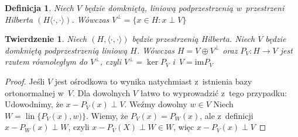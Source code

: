 \documentclass[11pt]{mwrep}
\renewcommand{\[}{\begin{equation}}
\renewcommand{\]}{\end{equation}}
\newcommand{\lin}{\operatorname{lin}}
\newcommand{\scal}{\langle \cdot,\cdot \rangle}
\newcommand{\im}{\mathrm{im}}
\newtheorem{twr}[subsection]{Twierdzenie}%
\newtheorem{de}[subsection]{Definicja}
\begin{document}
\begin{de}
	Niech $V$ będzie domkniętą, liniową  podprzestrzenią w~przestrzeni Hilberta $(H\scal)$.
	Wówczas $V^\perp = \{x \in H : x\perp V\}$ 
\end{de}
\begin{twr}
	Niech $(H,\scal)$ będzie przestrzenią Hilberta. Niech $V$ będzie domkniętą podprzestrzenią liniową $H$.
	Wówczas $H = V\oplus V^\perp$ oraz $P_V \colon H \to V$  jest rzutem równoległym do $V^\perp$, czyli $V^\perp = \ker P_V$ i~$V = \im P_V$
\end{twr}
\begin{proof}
	Jeśli $V$ jest ośrodkowa to wynika natychmiast z~istnienia bazy ortonormalnej w~$V$.
	Dla dowolnych $V$ łatwo to wyprowadzić z~tego przypadku:\\
	Udowodnimy, że $x-P_V(x) \perp V$. Weźmy dowolny $w \in V$ 
	Niech $W= \lin\{P_V(x),w)\}$. Wiemy, że $P_V(x) = P_W(x)$, ale  z~definicji $x- P_W(x)  \perp W$, czyli $x-P_V(X) \perp W\in W$, więc $x - P_V(x) \perp V$ 
\end{proof}
\end{document}
